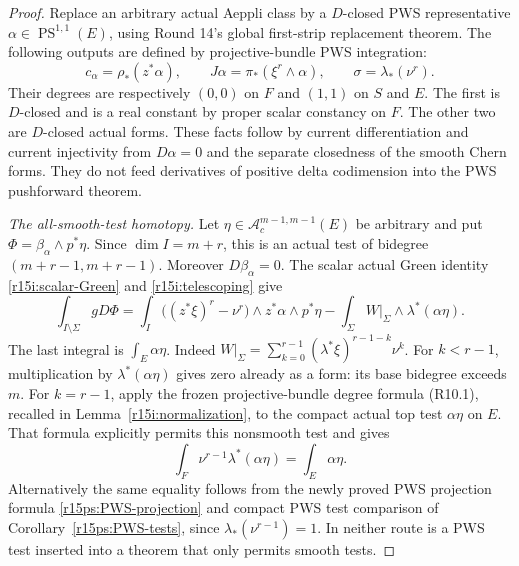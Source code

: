 \begin{proof}
Replace an arbitrary actual Aeppli class by a $D$-closed PWS
representative $\alpha\in\operatorname{PS}^{1,1}(E)$,
using Round 14's global first-strip replacement theorem.
The following outputs are defined by projective-bundle PWS
integration:
\[
 c_\alpha=\rho_*(z^*\alpha),\qquad
 J\alpha=\pi_*(\xi^r\wedge\alpha),\qquad
 \sigma=\lambda_*(\nu^r).
\tag{I15.13}\label{r15i:auxiliary-outputs}
\]
Their degrees are respectively $(0,0)$ on $F$ and $(1,1)$
on $S$ and $E$.  The first is $D$-closed and is a real
constant by proper scalar constancy on $F$.  The other two
are $D$-closed actual forms.  These facts follow by current
differentiation and current injectivity from $D\alpha=0$
and the separate closedness of the smooth Chern forms.
They do not feed derivatives of positive delta codimension
into the PWS pushforward theorem.

\emph{The all-smooth-test homotopy.}
Let $\eta\in\mathcal A_c^{m-1,m-1}(E)$ be arbitrary and
put $\Phi=\beta_\alpha\wedge p^*\eta$.
Since $\dim I=m+r$, this is an actual test of bidegree
$(m+r-1,m+r-1)$.  Moreover $D\beta_\alpha=0$.
The scalar actual Green identity \eqref{r15i:scalar-Green}
and \eqref{r15i:telescoping} give
\[
 \int_{I\setminus\Sigma}gD\Phi
  =\int_I\bigl((z^*\xi)^r-\nu^r\bigr)
                           \wedge z^*\alpha\wedge p^*\eta
        -\int_\Sigma W|_\Sigma\wedge\lambda^*(\alpha\eta).
\tag{I15.14}\label{r15i:scalar-pairing}
\]
The last integral is $\int_E\alpha\eta$.
Indeed
$W|_\Sigma=\sum_{k=0}^{r-1}(\lambda^*\xi)^{r-1-k}\nu^k$.
For $k<r-1$, multiplication by $\lambda^*(\alpha\eta)$
gives zero already as a form: its base bidegree exceeds $m$.
For $k=r-1$, apply the frozen projective-bundle degree
formula (R10.1), recalled in
Lemma~\ref{r15i:normalization}, to the compact actual top
test $\alpha\eta$ on $E$.  That formula explicitly permits
this nonsmooth test and gives
\[
        \int_F\nu^{r-1}\lambda^*(\alpha\eta)
                                          =\int_E\alpha\eta.
\]
Alternatively the same equality follows from the newly
proved PWS projection formula
\eqref{r15ps:PWS-projection} and compact PWS test comparison
of Corollary~\ref{r15ps:PWS-tests}, since
$\lambda_*(\nu^{r-1})=1$.  In neither route is a PWS test
inserted into a theorem that only permits smooth tests.


\end{proof}
